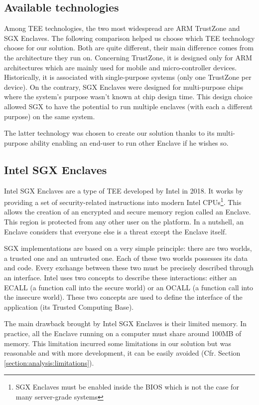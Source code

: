 \documentclass[../main.tex]{subfiles}
\begin{document}
\subsection{Available technologies}
\label{section:theoric:tee_trustzone_vs_sgx}
\par Among TEE technologies, the two most widespread are ARM TrustZone and SGX Enclaves. The following comparison helped us choose which TEE technology choose for our solution. Both are quite different, their main difference comes from the architecture they run on. Concerning TrustZone, it is designed only for ARM architectures which are mainly used for mobile and micro-controller devices. Historically, it is associated with single-purpose systems (only one TrustZone per device). On the contrary, SGX Enclaves were designed for multi-purpose chips where the system's purpose wasn't known at chip design time. This design choice allowed SGX to have the potential to run multiple enclaves (with each a different purpose) on the same system.
\par The latter technology was chosen to create our solution thanks to its multi-purpose ability enabling an end-user to run other Enclave if he wishes so.


\subsection{Intel SGX Enclaves}
\label{section:theoric:intel_sgx}
\par Intel SGX Enclaves are a type of TEE developed by Intel in 2018. It works by providing a set of security-related instructions into modern Intel CPUs\footnote{SGX Enclaves must be enabled inside the BIOS which is not the case for many server-grade systems}. This allows the creation of an encrypted and secure memory region called an Enclave. This region is protected from any other user on the platform. In a nutshell, an Enclave considers that everyone else is a threat except the Enclave itself.
\par SGX implementations are based on a very simple principle: there are two worlds, a trusted one and an untrusted one.  Each of these two worlds possesses its data and code. Every exchange between these two must be precisely described through an interface. Intel uses two concepts to describe these interactions: either an ECALL (a function call into the secure world) or an OCALL (a function call into the insecure world). These two concepts are used to define the interface of the application (its Trusted Computing Base).
\par The main drawback brought by Intel SGX Enclaves is their limited memory. In practice, all the Enclave running on a computer must share around 100MB of memory. This limitation incurred some limitations in our solution but was reasonable and with more development, it can be easily avoided (Cfr. Section \ref{section:analysis:limitations}).
\end{document}
